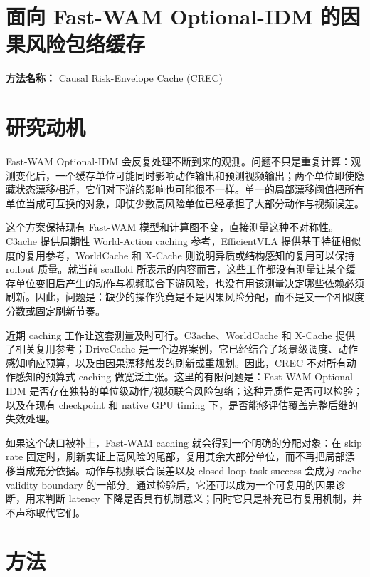\documentclass[10pt,a4paper]{article}
\begin{document}
\section*{面向 Fast-WAM Optional-IDM 的因果风险包络缓存}
\textbf{方法名称：} Causal Risk-Envelope Cache (CREC)
\section*{研究动机}
Fast-WAM Optional-IDM 会反复处理不断到来的观测。问题不只是重复计算：观测变化后，一个缓存单位可能同时影响动作输出和预测视频输出；两个单位即使隐藏状态漂移相近，它们对下游的影响也可能很不一样。单一的局部漂移阈值把所有单位当成可互换的对象，即使少数高风险单位已经承担了大部分动作与视频误差。

这个方案保持现有 Fast-WAM 模型和计算图不变，直接测量这种不对称性。C3ache 提供周期性 World-Action caching 参考，EfficientVLA 提供基于特征相似度的复用参考，WorldCache 和 X-Cache 则说明异质或结构感知的复用可以保持 rollout 质量。就当前 scaffold 所表示的内容而言，这些工作都没有测量让某个缓存单位变旧后产生的动作与视频联合下游风险，也没有用该测量决定哪些依赖必须刷新。因此，问题是：缺少的操作究竟是不是因果风险分配，而不是又一个相似度分数或固定刷新节奏。

近期 caching 工作让这套测量及时可行。C3ache、WorldCache 和 X-Cache 提供了相关复用参考；DriveCache 是一个边界案例，它已经结合了场景级调度、动作感知响应预算，以及由因果漂移触发的刷新或重规划。因此，CREC 不对所有动作感知的预算式 caching 做宽泛主张。这里的有限问题是：Fast-WAM Optional-IDM 是否存在独特的单位级动作/视频联合风险包络；这种异质性是否可以检验；以及在现有 checkpoint 和 native GPU timing 下，是否能够评估覆盖完整后继的失效处理。

如果这个缺口被补上，Fast-WAM caching 就会得到一个明确的分配对象：在 skip rate 固定时，刷新实证上高风险的尾部，复用其余大部分单位，而不再把局部漂移当成充分依据。动作与视频联合误差以及 closed-loop task success 会成为 cache validity boundary 的一部分。通过检验后，它还可以成为一个可复用的因果诊断，用来判断 latency 下降是否具有机制意义；同时它只是补充已有复用机制，并不声称取代它们。
\section*{方法}
\end{document}
